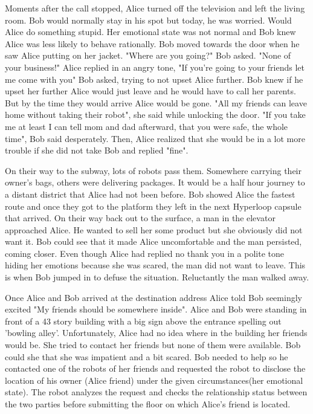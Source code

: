 \documentclass{lncs}
\begin{document}
Moments after the call stopped, Alice turned off the television and left the living room. Bob would normally stay in his spot but today, he was worried. Would Alice do something stupid. Her emotional state was not normal and Bob knew Alice was less likely to behave rationally. Bob moved towards the door when he saw Alice putting on her jacket. "Where are you going?" Bob asked. "None of your business!" Alice replied in an angry tone, "If you're going to your friends let me come with you" Bob asked, trying to not upset Alice further. Bob knew if he upset her further Alice would just leave and he would have to call her parents. But by the time they would arrive Alice would be gone. "All my friends can leave home without taking their robot", she said while unlocking the door. "If you take me at least I can tell mom and dad afterward, that you were safe, the whole time", Bob said desperately. Then, Alice realized that she would be in a lot more trouble if she did not take Bob and replied "fine".

On their way to the subway, lots of robots pass them. Somewhere carrying their owner's bags, others were delivering packages. It would be a half hour journey to a distant district that Alice had not been before. Bob showed Alice the fastest route and once they got to the platform they left in the next Hyperloop capsule that arrived. On their way back out to the surface, a man in the elevator approached Alice. He wanted to sell her some product but she obviously did not want it. Bob could see that it made Alice uncomfortable and the man persisted, coming closer. Even though Alice had replied no thank you in a polite tone hiding her emotions because she was scared, the man did not want to leave. This is when Bob jumped in to defuse the situation. Reluctantly the man walked away.

Once Alice and Bob arrived at the destination address Alice told Bob seemingly excited "My friends should be somewhere inside". Alice and Bob were standing in front of a 43 story building with a big sign above the entrance spelling out 'bowling alley'. Unfortunately, Alice had no idea where in the building her friends would be. She tried to contact her friends but none of them were available. Bob could she that she was impatient and a bit scared. Bob needed to help so he contacted one of the robots of her friends and requested the robot to disclose the location of his owner (Alice friend) under the given circumstances(her emotional state). The robot analyzes the request and checks the relationship status between the two parties before submitting the floor on which Alice's friend is located.
\end{document}
